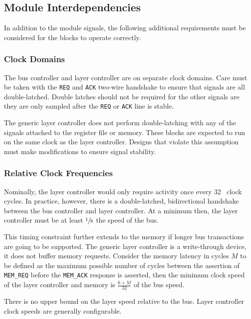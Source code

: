 \subsection{Module Interdependencies}
\label{sec:interdependencies}
In addition to the module signals, the following additional requirements must
be considered for the blocks to operate correctly.

\subsubsection{Clock Domains}
The bus controller and layer controller are on separate clock domains. Care
must be taken with the {\tt REQ} and {\tt ACK} two-wire handshake to ensure
that signals are all double-latched. Double latches should not be required for
the other signals are they are only sampled after the {\tt REQ} or {\tt ACK}
line is stable.

The generic layer controller does not perform double-latching with any of the
signals attached to the register file or memory. These blocks are expected to
run on the same clock as the layer controller. Designs that violate this
assumption must make modifications to ensure signal stability.

\subsubsection{Relative Clock Frequencies}
\label{sec:interdependencies:frequencies}
Nominally, the layer controller would only require activity once every 32~\bus
clock cycles. In practice, however, there is a double-latched, bidirectional
handshake between the bus controller and layer controller. At a minimum then,
the layer controller must be at least $\sfrac{1}{8}$ the speed of the bus.

This timing constraint further extends to the memory if longer bus
transactions are going to be supported. The generic layer controller is a
write-through device, it does not buffer memory requests. Consider the memory
latency in cycles $M$ to be defined as the maximum possible number of cycles
between the assertion of {\tt MEM\_REQ} before the {\tt MEM\_ACK} response is
asserted, then the minimum clock speed of the layer controller and memory is
$\frac{6+M}{32}$ of the bus speed.

There is no upper bound on the layer speed relative to the bus.
Layer controller clock speeds are generally configurable.
